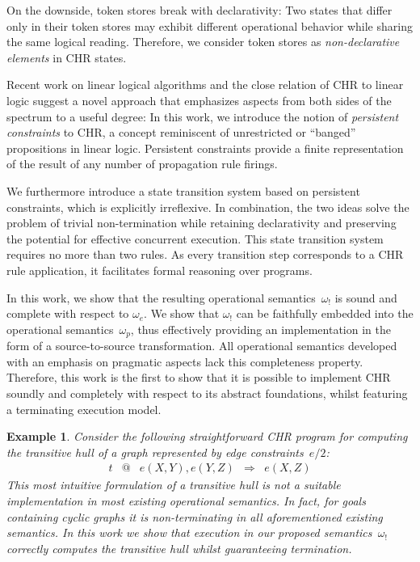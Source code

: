 \documentclass{tlp}
\newtheorem{example}{Example}[section]
\newcommand{\bang}{\ensuremath{!}}
\newcommand{\obang}{\ensuremath{{\omega_\bang}}}
\begin{document}
On the downside, token stores break with declarativity: Two states that differ
only in their token stores may exhibit different operational behavior while
sharing the same logical reading. Therefore, we consider token stores as
\emph{non-declarative elements} in CHR states.

Recent work on linear logical algorithms \cite{Simmons2008} and the close
relation of CHR to linear logic \cite{betzfruehwirth05} suggest a novel approach
that emphasizes aspects from both sides of the spectrum to a useful degree:
In this work, we introduce the notion of \emph{persistent constraints} to CHR, a
concept reminiscent of unrestricted or ``banged'' propositions in linear logic.
Persistent constraints provide a finite representation of the result of any
number of propagation rule firings.

We furthermore introduce a state transition system based on persistent
constraints, which is explicitly irreflexive. In combination, the two ideas
solve the problem of trivial non-termination while retaining declarativity and
preserving the potential for effective concurrent execution. This state
transition system requires no more than two rules. As every transition step
corresponds to a CHR rule application, it facilitates formal reasoning over
programs.

In this work, we show that the resulting operational semantics~$\obang$ is sound
and complete with respect to $\omega_e$. We show that $\obang$ can be faithfully
embedded into the operational semantics~$\omega_p$, thus effectively providing an
implementation in the form of a source-to-source transformation. All operational
semantics developed with an emphasis on pragmatic aspects lack this completeness
property. Therefore, this work is the first to show that it is possible to
implement CHR soundly and completely with respect to its abstract foundations,
whilst featuring a terminating execution model.

\begin{example}\label{ex:trans}
Consider the following straightforward CHR program for computing the transitive
hull of a graph represented by edge constraints~$e/2$: \[
\begin{array}{lclcl}
t & @ & e(X,Y), e(Y,Z) & \Longrightarrow & e(X,Z)
\end{array}
\]
This most intuitive formulation of a transitive hull is not a suitable
implementation in most existing operational semantics. In fact, for goals
containing cyclic graphs it is non-terminating in all aforementioned existing
semantics. In this work we show that execution in our proposed
semantics~$\obang$ correctly computes the transitive hull whilst guaranteeing
termination.
\end{example}
\end{document}
